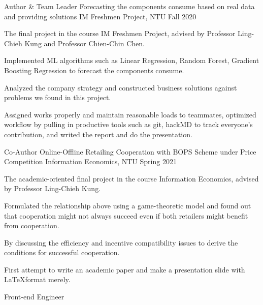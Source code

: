 \begin{cventries}
  \cventry
    {Author \& Team Leader} %
    {Forecasting the components consume based on real data and providing solutions} %
    {IM Freshmen Project, NTU} %
    {Fall 2020} %
    {
      \begin{cvitems} %
        \item {The final project in the course IM Freshmen Project, 
            advised by Professor Ling-Chieh Kung and Professor Chien-Chin Chen.}
        \item {Implemented ML algorithms such as Linear Regression, Random Forest,
            Gradient Boosting Regression to forecast the components consume.}
        \item {Analyzed the company strategy and constructed business solutions
            against problems we found in this project.}
        \item {Assigned works properly and maintain reasonable loads to teammates,
            optimized workflow by pulling in productive tools such as git, hackMD
            to track everyone's contribution, and writed the report and do the presentation.}
      \end{cvitems}
    }
  \cventry
    {Co-Author}
    {Online-Offline Retailing Cooperation with BOPS Scheme under Price Competition}
    {Information Economics, NTU}
    {Spring 2021}
    {
        \begin{cvitems}
            \item {The academic-oriented final project in the course Information Economics,
                advised by Professor Ling-Chieh Kung.}
            \item {Formulated the relationship above using a game-theoretic model
                and found out that cooperation might not always succeed even if both
                retailers might benefit from cooperation.}
            \item {By discussing the efficiency and incentive compatibility issues to
                derive the conditions for successful cooperation.}
            \item {First attempt to write an academic paper and make a presentation
                slide with \LaTeX format merely.}
        \end{cvitems}
    }
  \cventry
    {Front-end Engineer} %

\end{cventries}
